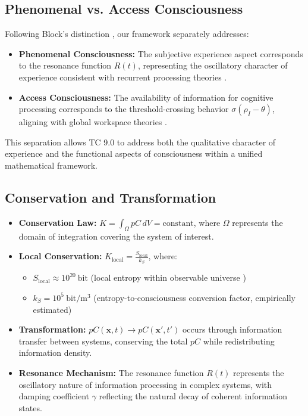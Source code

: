 \documentclass[12pt]{article}
\newcommand{\bit}{\text{bit}}
\begin{document}
\subsection{Phenomenal vs. Access Consciousness}
Following Block's distinction \cite{block2007}, our framework separately addresses:

\begin{itemize}
    \item \textbf{Phenomenal Consciousness:} The subjective experience aspect corresponds to the resonance function $R(t)$, representing the oscillatory character of experience consistent with recurrent processing theories \cite{lamme2006}.
    
    \item \textbf{Access Consciousness:} The availability of information for cognitive processing corresponds to the threshold-crossing behavior $\sigma(\rho_I - \theta)$, aligning with global workspace theories \cite{dehaene2011}.
\end{itemize}

This separation allows TC 9.0 to address both the qualitative character of experience and the functional aspects of consciousness within a unified mathematical framework.

\subsection{Conservation and Transformation}
\begin{itemize}
    \item \textbf{Conservation Law:} $K = \int_{\Omega} pC \, dV = \text{constant}$, where $\Omega$ represents the domain of integration covering the system of interest.
    
    \item \textbf{Local Conservation:} $K_{\text{local}} = \frac{S_{\text{local}}}{k_S}$, where:
    \begin{itemize}[label=--]
        \item $S_{\text{local}} \approx 10^{20}~\bit$ (local entropy within observable universe \cite{susskind1995})
        \item $k_S = 10^{5}~\bit/\text{m}^3$ (entropy-to-consciousness conversion factor, empirically estimated)
    \end{itemize}
    
    \item \textbf{Transformation:} $pC(\mathbf{x}, t) \rightarrow pC(\mathbf{x'}, t')$ occurs through information transfer between systems, conserving the total $pC$ while redistributing information density.
    
    \item \textbf{Resonance Mechanism:} The resonance function $R(t)$ represents the oscillatory nature of information processing in complex systems, with damping coefficient $\gamma$ reflecting the natural decay of coherent information states.
\end{itemize}
\end{document}
